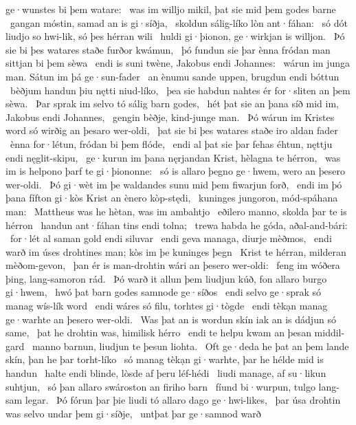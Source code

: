 ge·wunstes bi þem watare: \hld\ was im willjo mikil,
þat sie mid þem godes barne \hld\ gangan móstin,
samad an is gi·síðja, \hld\ skoldun sálig-líko
lòn ant·fáhan: \hld\ só dót liudjo so hwi-lik,
só þes hérran wili \hld\ huldi gi·þionon,
ge·wirkjan is willjon. \hld\ Þó sie bi þes watares staðe
furðor kwámun, \hld\ þó fundun sie þar ènna fródan man
sittjan bi þem sèwa \hld\ endi is suni twène,
Jakobus endi Johannes: \hld\ wárun im junga man.
Sátun im þá ge·sun-fader \hld\ an ènumu sande uppen,
brugdun endi bóttun \hld\ bèðjum handun
þiu nętti niud-líko, \hld\ þea sie habdun nahtes ér
for·sliten an þem sèwa. \hld\ Þar sprak im selvo tó
sálig barn godes, \hld\ hét þat sie an þana síð mid im,
Jakobus endi Johannes, \hld\ gengin bèðje,
kind-junge man. \hld\ Þó wárun im Kristes word
só wirðig an þesaro wer-oldi, \hld\ þat sie bi þes watares staðe
iro aldan fader \hld\ ènna for·létun,
fródan bi þem flóde, \hld\ endi al þat sie þar fehas éhtun,
nęttju endi nęglit-skipu, \hld\ ge·kurun im þana nęrjandan Krist,
hèlagna te hérron, \hld\ was im is helpono þarf
te gi·þiononne: \hld\ só is allaro þegno ge·hwem,
wero an þesero wer-oldi. \hld\ Þó gi·wèt im þe waldandes sunu
mid þem fiwarjun forð, \hld\ endi im þó þana fífton gi·kòs
Krist an ènero kòp-stędi, \hld\ kuninges jungoron,
mód-spáhana man: \hld\ Mattheus was he hètan,
was im ambahtjo \hld\ eðilero manno,
skolda þar te is hérron \hld\ handun ant·fáhan
tins endi tolna; \hld\ trewa habda he góda,
aðal-and-bári: \hld\ for·lét al saman
gold endi siluvar \hld\ endi geva managa,
diurje mèðmos, \hld\ endi warð im úses drohtines man;
kòs im þe kuninges þegn \hld\ Krist te hérran,
milderan mèðom-gevon, \hld\ þan ér is man-drohtin
wári an þesero wer-oldi: \hld\ feng im wóðera þing,
lang-samoron rád. \hld\ Þó warð it allun þem liudjun kúð,
fon allaro burgo gi·hwem, \hld\ hwó þat barn godes
samnode ge·síðos \hld\ endi selvo ge·sprak
só manag wís-lík word \hld\ endi wáres só filu,
torhtes gi·tògde \hld\ endi tèkạn manag
ge·warhte an þesero wer-oldi. \hld\ Was þat an is wordun skín
iak an is dádjun só same, \hld\ þat he drohtin was,
himilisk hérro \hld\ endi te helpu kwam
an þesan middil-gard \hld\ manno barnun,
liudjun te þesun liohta. \hld\ Oft ge·deda he þat an þem lande skín,
þan he þar torht-líko \hld\ só manag tèkạn gi·warhte,
þar he hélde mid is handun \hld\ halte endi blinde,
lòsde af þeru léf-hédi \hld\ liudi manage,
af su·likun suhtjun, \hld\ só þan allaro swároston
an firiho barn \hld\ fíund bi·wurpun,
tulgo lang-sam legar. \hld\ Þó fórun þar þie liudi tó
allaro dago ge·hwi-likes, \hld\ þar úsa drohtin was
selvo undar þem gi·síðje, \hld\ untþat þar ge·samnod warð

